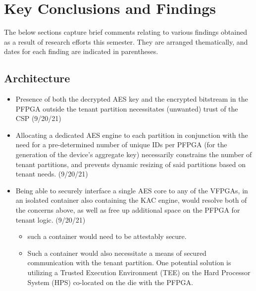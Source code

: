 \chapter{Key Conclusions and Findings}\label{chap:Findings}
The below sections capture brief comments relating to various findings obtained as a result of research efforts this semester. They are arranged thematically, and dates for each finding are indicated in parentheses.

\section{Architecture}\label{sec:Architecture}
\begin{itemize}
    \item Presence of both the decrypted AES key and the encrypted bitstream in the PFPGA outside the tenant partition necessitates (unwanted) trust of the CSP (9/20/21)
    \item Allocating a dedicated AES engine to each partition in conjunction with the need for a pre-determined number of unique IDs per PFPGA (for the generation of the device's aggregate key) necessarily constrains the number of tenant partitions, and prevents dynamic resizing of said partitions based on tenant needs. (9/20/21)
    \item Being able to securely interface a single AES core to any of the VFPGAs, in an isolated container also containing the KAC engine, would resolve both of the concerns above, as well as free up additional space on the PFPGA for tenant logic. (9/20/21)
    \begin{itemize}
        \item such a container would need to be attestably secure.
        \item Such a container would also necessitate a means of secured communication with the tenant partition. One potential solution is utilizing a Trusted Execution Environment (TEE) on the Hard Processor System (HPS) co-located on the die with the PFPGA.
    \end{itemize}
\end{itemize}

